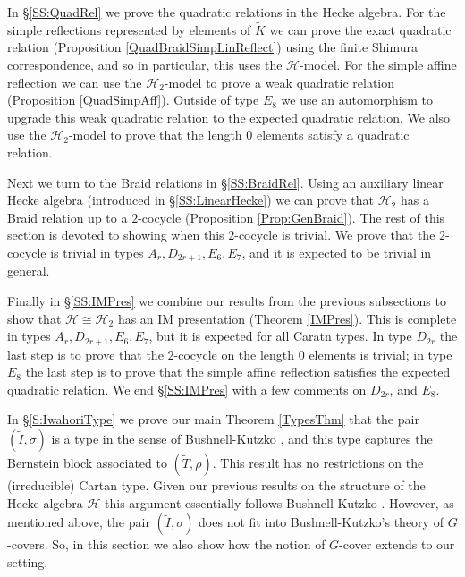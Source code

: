 \documentclass[10pt, letterpaper]{amsart}
\theoremstyle{plain}
\theoremstyle{definition}
\numberwithin{equation}{section}
\newcommand{\It}{\widetilde{I}}
\newcommand{\Kt}{\widetilde{K}}
\newcommand{\Tt}{\widetilde{T}}
\newcommand{\Hcal}{\mathcal{H}}
\begin{document}
In \S \ref{SS:QuadRel} we prove the quadratic relations in the Hecke algebra. For the simple reflections represented by elements of $\Kt$ we can prove the exact quadratic relation (Proposition \ref{QuadBraidSimpLinReflect}) using the finite Shimura correspondence, and so in particular, this uses the $\Hcal$-model. For the simple affine reflection we can use the $\Hcal_{2}$-model to prove a weak quadratic relation (Proposition \ref{QuadSimpAff}). Outside of type $E_{8}$ we use an automorphism to upgrade this weak quadratic relation to the expected quadratic relation. We also use the $\Hcal_{2}$-model to prove that the length $0$ elements satisfy a quadratic relation.

Next we turn to the Braid relations in \S \ref{SS:BraidRel}. Using an auxiliary linear Hecke algebra (introduced in \S \ref{SS:LinearHecke}) we can prove that $\Hcal_{2}$ has a Braid relation up to a $2$-cocycle (Proposition \ref{Prop:GenBraid}). The rest of this section is devoted to showing when this $2$-cocycle is trivial. We prove that the $2$-cocycle is trivial in types $A_{r},D_{2r+1},E_{6},E_{7}$, and it is expected to be trivial in general. 


Finally in \S \ref{SS:IMPres} we combine our results from the previous subsections to show that $\Hcal\cong\Hcal_{2}$ has an IM presentation (Theorem \ref{IMPres}). This is complete in types $A_{r},D_{2r+1},E_{6},E_{7}$, but it is expected for all Caratn types. In type $D_{2r}$ the last step is to prove that the $2$-cocycle on the length $0$ elements is trivial; in type $E_{8}$ the last step is to prove that the simple affine reflection satisfies the expected quadratic relation. We end \S \ref{SS:IMPres} with a few comments on $D_{2r}$, and $E_{8}$.

In \S \ref{S:IwahoriType} we prove our main Theorem \ref{TypesThm} that the pair $(\It,\sigma)$ is a type in the sense of Bushnell-Kutzko \cite[(4.1) Definition]{BK98}, and this type captures the Bernstein block associated to $(\Tt,\rho)$. This result has no restrictions on the (irreducible) Cartan type. Given our previous results on the structure of the Hecke algebra $\Hcal$ this argument essentially follows Bushnell-Kutzko \cite{BK98}. However, as mentioned above, the pair $(\It,\sigma)$ does not fit into Bushnell-Kutzko's theory of $G$-covers. So, in this section we also show how the notion of $G$-cover extends to our setting.
\end{document}
